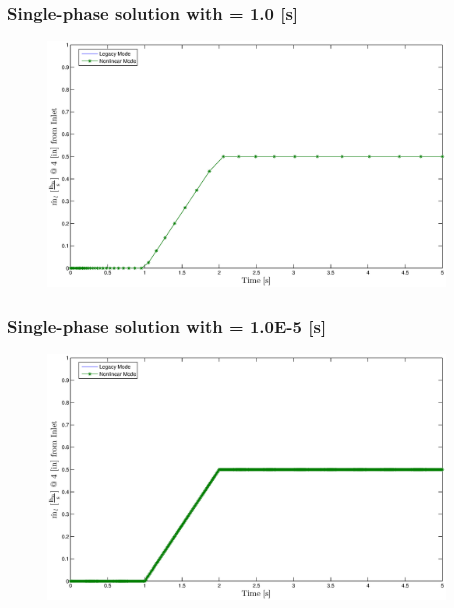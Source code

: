 \documentclass[compress,xcolor=table]{beamer}
\begin{document}
\begin{frame}
\frametitle{Single-phase solution with \dtmax{} = 1.0 {[s]}}

\begin{figure}[h!t]
\centering
\includegraphics[width=0.94\textwidth]{images/single_1em0.eps}
\end{figure}

\end{frame}
\begin{frame}
\frametitle{Single-phase solution with \dtmax{} = 1.0E-5 {[s]}}

\begin{figure}[h!t]
\centering
\includegraphics[width=0.94\textwidth]{images/single_1em5.eps}
\end{figure}

\end{frame}
\end{document}
